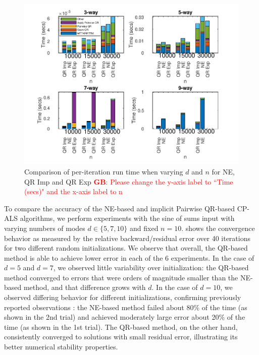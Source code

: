 \documentclass{article}
\newcommand{\GB}[1]{\textcolor{red}{\textbf{GB}: #1}}
\begin{document}
\begin{figure}[ht!]
  \begin{center}
    \includegraphics[scale = 1.2]{Fig_kt.pdf}
    \caption[Figure]{Comparison of per-iteration run time when varying $d$ and $n$ for NE, QR Imp and QR Exp \GB{Please change the y-axis label to ``Time (secs)" and the x-axis label to n} \label{fig:runtime}}
  \end{center}
\end{figure}


To compare the accuracy of the NE-based and implicit Pairwise QR-based CP-ALS algorithms, we perform experiments with the sine of sums input with varying numbers of modes $d\in \{5,7,10\}$ and fixed $n=10$.
 shows the convergence behavior as measured by the relative backward/residual error over 40 iterations for two different random initializations.
We observe that overall, the QR-based method is able to achieve lower error in each of the 6 experiments.
In the case of $d=5$ and $d=7$, we observed little variability over initialization: the QR-based method converged to errors that were orders of magnitude smaller than the NE-based method, and that difference grows with $d$.
In the case of $d=10$, we observed differing behavior for different initializations, confirming previously reported observations \cite{MVLB23}: the NE-based method failed about 80\% of the time (as shown in the 2nd trial) and achieved moderately large error about 20\% of the time (as shown in the 1st trial).
The QR-based method, on the other hand, consistently converged to solutions with small residual error, illustrating its better numerical stability properties.
\end{document}

